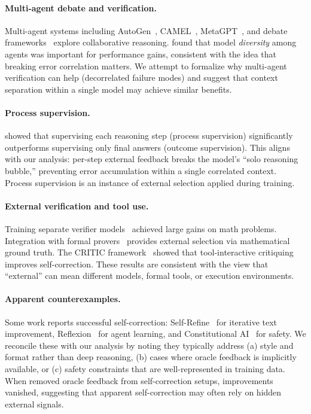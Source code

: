 \documentclass[11pt]{article}
\begin{document}
\paragraph{Multi-agent debate and verification.} Multi-agent systems including
AutoGen~\citep{wu2023autogen}, CAMEL~\citep{li2023camel}, MetaGPT~\citep{hong2023metagpt},
and debate frameworks~\citep{du2023debate, liang2023debate} explore collaborative reasoning.
\citet{chen2024reconcile} found that model \textit{diversity} among agents was important for
performance gains, consistent with the idea that breaking error correlation matters. We
attempt to formalize why multi-agent verification can help (decorrelated failure modes) and
suggest that context separation within a single model may achieve similar benefits.

\paragraph{Process supervision.} \citet{lightman2023process} showed that supervising each
reasoning step (process supervision) significantly outperforms supervising only final answers
(outcome supervision). This aligns with our analysis: per-step external feedback breaks the
model's ``solo reasoning bubble,'' preventing error accumulation within a single correlated
context. Process supervision is an instance of external selection applied during training.

\paragraph{External verification and tool use.} Training separate verifier
models~\citep{cobbe2021verifier} achieved large gains on math problems. Integration with
formal provers~\citep{yang2023leandojo, polu2020generative, baba2025prover} provides external
selection via mathematical ground truth. The CRITIC framework~\citep{gou2023critic} showed
that tool-interactive critiquing improves self-correction. These results are consistent with
the view that ``external'' can mean different models, formal tools, or execution environments.

\paragraph{Apparent counterexamples.} Some work reports successful self-correction:
Self-Refine~\citep{madaan2023selfrefine} for iterative text improvement,
Reflexion~\citep{shinn2023reflexion} for agent learning, and Constitutional
AI~\citep{bai2022constitutional} for safety. We reconcile these with our analysis by noting
they typically address (a) style and format rather than deep reasoning, (b) cases where
oracle feedback is implicitly available, or (c) safety constraints that are well-represented
in training data. When \citet{huang2024selfcorrect} removed oracle feedback from
self-correction setups, improvements vanished, suggesting that apparent self-correction may
often rely on hidden external signals.
\end{document}
